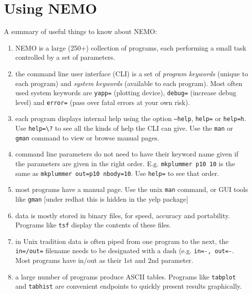 \chapter                {Using NEMO}

A summary of useful things to know about NEMO:
\begin{enumerate}

\item
NEMO is a large (250+) collection of programs, each performing a small task
controlled by a set of parameters.

\item
the command line user interface (CLI) is a set of {\it program keywords}
(unique to each program) and {\it system keywords}
(available to each program).
Most often used system keywords are {\tt yapp=} (plotting device),
{\tt debug=} (increase debug level) and {\tt error=} (pass over fatal errors
at your own risk).

\item
each program displays internal help using the option 
{\tt --help}, {\tt help=} or {\tt help=h}. Use \verb+help=\?+ to see
all the kinds of help the CLI can give. Use
the {\tt man} or {\tt gman} command to view or browse manual pages.

\item
command line parameters do not need to have their keyword name given
if the parameters are given in the right order. 
E.g. {\tt mkplummer p10 10} is the same as 
{\tt mkplummer out=p10 nbody=10}. Use {\tt help=} to see that order.

\item
most programs have a manual page. Use the unix {\tt man} command, or
GUI tools like {\tt gman}  [under redhat this is hidden in the yelp package]

\item
data is mostly stored in binary files, for speed, accuracy and portability.
Programs like {\tt tsf} display the contents of these files.

\item
in  Unix tradition data is often piped from one program to the next, the
{\tt in=/out=} filename  needs to be designated with a dash 
(e.g. {\tt in=-, out=-}.   Most programs have in/out as their 1st and 
2nd parameter.

\item
a large number of programs produce ASCII tables. Programs like
{\tt tabplot} and {\tt tabhist} are convenient endpoints to
quickly present results graphically.

\end{enumerate}

